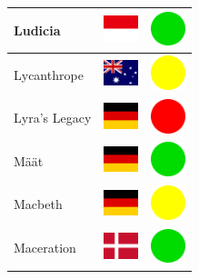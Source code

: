 \documentclass[12pt, a4paper, twoside]{report}
\begin{document}
\begin{center}
\begin{longtable}{|p{5cm}|p{2cm}|p{2cm}|}
Ludicia & \includegraphics[width=1cm]{4x3/id} & \includegraphics[width=1cm]{likes/y} \\ \hline
Lycanthrope & \includegraphics[width=1cm]{4x3/au} & \includegraphics[width=1cm]{likes/m} \\ \hline
Lyra's Legacy & \includegraphics[width=1cm]{4x3/de} & \includegraphics[width=1cm]{likes/n} \\ \hline
Määt & \includegraphics[width=1cm]{4x3/de} & \includegraphics[width=1cm]{likes/y} \\ \hline
Macbeth & \includegraphics[width=1cm]{4x3/de} & \includegraphics[width=1cm]{likes/m} \\ \hline
Maceration & \includegraphics[width=1cm]{4x3/dk} & \includegraphics[width=1cm]{likes/y} \\ \hline

\end{longtable}
\end{center}
\end{document}
